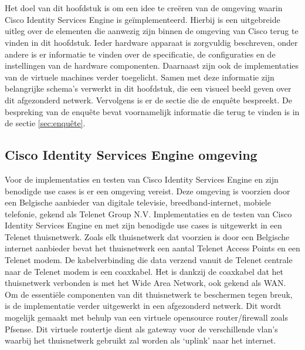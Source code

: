 
\chapter{}
\label{ch:Proof of concept}

Het doel van dit hoofdstuk is om een idee te creëren van de omgeving waarin Cisco Identity Services Engine is geïmplementeerd. Hierbij is een uitgebreide uitleg over de elementen die aanwezig zijn binnen de omgeving van Cisco terug te vinden in dit hoofdstuk. Ieder hardware apparaat is zorgvuldig beschreven, onder andere is er informatie te vinden over de specificatie, de configuraties en de instellingen van de hardware componenten. Daarnaast zijn ook de implementaties van de virtuele machines verder toegelicht.
\newline
\newline
Samen met deze informatie zijn belangrijke schema’s verwerkt in dit hoofdstuk, die een visueel beeld geven over dit afgezonderd netwerk. 
Vervolgens is er de sectie die de enquête bespreekt. De bespreking van de enquête bevat voornamelijk informatie die terug te vinden is in de sectie \ref{sec:enquête}. 

\section{Cisco Identity Services Engine omgeving}

Voor de implementaties en testen van Cisco Identity Services Engine en zijn benodigde use cases is er een omgeving vereist. Deze omgeving is voorzien door een Belgische aanbieder van digitale televisie, breedband-internet, mobiele telefonie, gekend als Telenet Group N.V. Implementaties en de testen van Cisco Identity Services Engine en met zijn benodigde use cases is uitgewerkt in een Telenet thuisnetwerk.
\newline
Zoals elk thuisnetwerk dat voorzien is door een Belgische internet aanbieder bevat het thuisnetwerk een aantal Telenet Access Points en een Telenet modem. De kabelverbinding die data verzend vanuit de Telenet centrale naar de Telenet modem is een coaxkabel. Het is dankzij de coaxkabel dat het thuisnetwerk verbonden is met het Wide Area Network, ook gekend als WAN.
\newline
\newline
Om de essentiële componenten van dit thuisnetwerk te beschermen tegen breuk, is de implementatie verder uitgewerkt in een afgezonderd netwerk. Dit wordt mogelijk gemaakt met behulp van een virtuele opensource router/firewall zoals Pfsense. Dit virtuele routertje dient als gateway voor de verschillende vlan’s waarbij het thuisnetwerk gebruikt zal worden als ‘uplink’ naar het internet. 



